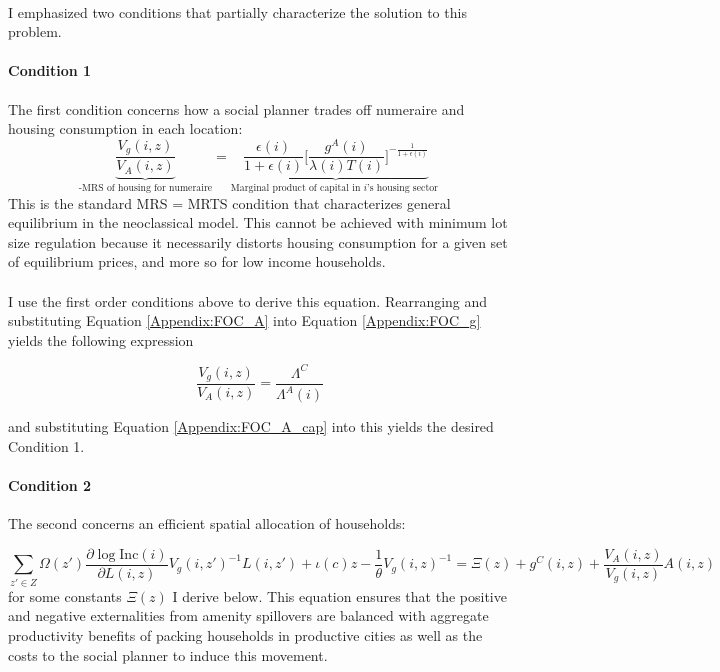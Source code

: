 \documentclass[12pt]{article}
\begin{document}
	
	\paragraph*{}
	I emphasized two conditions that partially characterize the solution to this problem. 
	
	\paragraph*{Condition 1} The first condition concerns how a social planner trades off numeraire and housing consumption in each location:
	\begin{equation}\label{Equation:housingConsOpt_appendix_planner}
		\underbrace{\frac{V_{g}(i, z)}{V_{A}(i, z)}}_{\text{-MRS of housing for numeraire}} = 	\underbrace{\frac{\epsilon(i)}{1 + \epsilon(i)} \bigg[\frac{g^{A}(i)}{\lambda(i)T(i)} \bigg]^{-\frac{1}{1 + \epsilon(i)}}}_{\text{Marginal product of capital in $i$'s housing sector }}
	\end{equation}
	This is the standard MRS = MRTS condition that characterizes general equilibrium in the neoclassical model. This cannot be achieved with minimum lot size regulation because it necessarily distorts housing consumption for a given set of equilibrium prices, and more so for low income households.
	
	\paragraph*{}
	I use the first order conditions above to derive this equation. Rearranging and substituting Equation \eqref{Appendix:FOC_A} into Equation \eqref{Appendix:FOC_g} yields the following expression
	
	\begin{equation}\label{Appendix:MRS_lgrange_condition}
		\frac{V_{g}(i, z)}{V_{A}(i, z)} = \frac{\Lambda^{C}}{\Lambda^{A}(i)}
	\end{equation}
	
	and substituting Equation \eqref{Appendix:FOC_A_cap} into this yields the desired Condition 1.
	
	
	\paragraph*{Condition 2} The second concerns an efficient spatial allocation of households:
	
	\begin{equation}
		\sum_{z' \in Z}\Omega(z')\frac{\partial \log \text{Inc}(i)}{\partial L(i, z)}V_{g}(i, z')^{-1}L(i, z') + \iota(c)z - \frac{1}{\theta}V_{g}(i, z)^{-1}= \Xi(z) + g^{C}(i, z) + \frac{V_{A}(i, z)}{V_{g}(i, z)}A(i, z)
	\end{equation}
	for some constants $\Xi(z)$ I derive below. This equation ensures that the positive and negative externalities from amenity spillovers are balanced with aggregate productivity benefits of packing households in productive cities as well as the costs to the social planner to induce this movement. 
	
\end{document}
